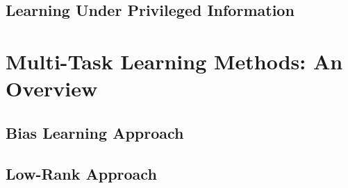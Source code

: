 



\subsection{Learning Under Privileged Information}



\section{Multi-Task Learning Methods: An Overview}

\subsection{Bias Learning Approach}



\subsection{Low-Rank Approach}

